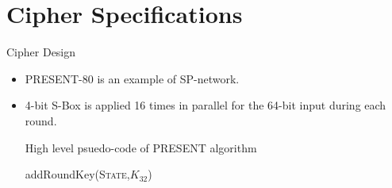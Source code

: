 \section{Cipher Specifications}

\begin{frame}[c]{Cipher Design}
\begin{itemize}
    \item PRESENT-80 is an example of SP-network.
    \item 4-bit S-Box is applied 16 times in parallel for the 64-bit input during each round.
    \begin{block}{High level psuedo-code of PRESENT algorithm}
        \begin{algorithmic}[1]
        \ENDFOR
        \STATE addRoundKey(\textsc{State},$K_{32}$)
        \end{algorithmic}
    \end{block}
\end{itemize}
\end{frame}

